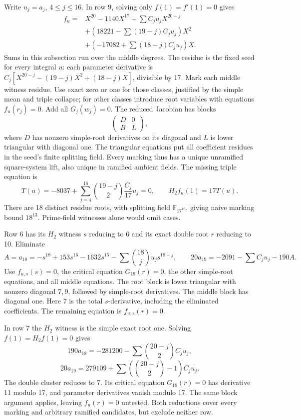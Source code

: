 \documentclass[
  british,
  10pt,
]{article}
\begin{document}
Write \(u_j=a_j\), \(4\le j\le16\). In row 9, solving only
\(f(1)=f'(1)=0\) gives \[
\begin{split}
 f_u={}&X^{20}-1140X^{17}+\sum C_ju_jX^{20-j}\\
 &+\left(18221-\sum(19-j)C_ju_j\right)X^2\\
 &+\left(-17082+\sum(18-j)C_ju_j\right)X.
\end{split}                                                    \tag{D6}
\] Sums in this subsection run over the middle degrees. The residue is
the fixed seed for every integral \(u\): each parameter derivative is
\(C_j[X^{20-j}-(19-j)X^2+(18-j)X]\), divisible by 17. Mark each middle
witness residue. Use exact zero or one for those classes, justified by
the simple mean and triple collapse; for other classes introduce root
variables with equations \(f_u(r_j)=0\). Add all \(G_j(w_j)=0\). The
reduced Jacobian has blocks \[
 \begin{pmatrix}D&0\\ B&L\end{pmatrix},
\] where \(D\) has nonzero simple-root derivatives on its diagonal and
\(L\) is lower triangular with diagonal one. The triangular equations
put all coefficient residues in the seed's finite splitting field. Every
marking thus has a unique unramified square-system lift, also unique in
ramified ambient fields. The missing triple equation is \[
 T(u)=-8037+\sum_{j=4}^{16}\binom{19-j}{2}\frac{C_j}{17}u_j=0,
 \qquad H_2f_u(1)=17T(u).                                    \tag{D7}
\] There are 18 distinct residue roots, with splitting field
\(\mathbb F_{17^{10}}\), giving naive marking bound \(18^{13}\).
Prime-field witnesses alone would omit cases.

Row 6 has its \(H_2\) witness \(s\) reducing to 6 and its exact double
root \(r\) reducing to 10. Eliminate \[
 A=a_{18}=-s^{18}+153s^{16}-1632s^{15}
       -\sum\binom{18}{j}u_js^{18-j},\qquad
 20a_{19}=-2091-\sum C_ju_j-190A.
\] Use \(f_{u,s}(s)=0\), the critical equation \(G_{19}(r)=0\), the
other simple-root equations, and all middle equations. The root block is
lower triangular with nonzero diagonal \(7,9\), followed by simple-root
derivatives. The middle block has diagonal one. Here 7 is the total
\(s\)-derivative, including the eliminated coefficients. The remaining
equation is \(f_{u,s}(r)=0\).

In row 7 the \(H_2\) witness is the simple exact root one. Solving
\(f(1)=H_2f(1)=0\) gives \[
 190a_{18}=-281200-\sum\binom{20-j}{2}C_ju_j,
\] \[
 20a_{19}=279109+\sum\left(\binom{20-j}{2}-1\right)C_ju_j.
\] The double cluster reduces to 7. Its critical equation
\(G_{19}(r)=0\) has derivative 11 modulo 17, and parameter derivatives
vanish modulo 17. The same block argument applies, leaving \(f_u(r)=0\)
untested. Both reductions cover every marking and arbitrary ramified
candidates, but exclude neither row.
\end{document}
